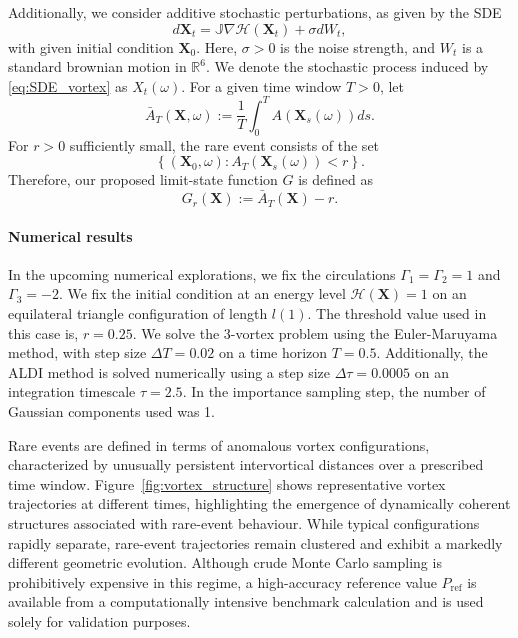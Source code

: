 \documentclass[a4paper]{article}
\numberwithin{equation}{section}
\begin{document}
Additionally, we consider additive stochastic perturbations, as given by the SDE
\begin{equation}
    \label{eq:SDE_vortex}
d\bm{X}_t = \mathbb{J} \nabla\mathcal{H}(\bm{X}_t) + \sigma dW_t,
\end{equation}
with given initial condition $\bm{X}_0$. 
Here, $\sigma>0$ is the noise strength, and $W_t$ is a standard brownian motion in $\mathbb{R}^6$. We denote the stochastic process induced by \eqref{eq:SDE_vortex} as $X_t(\omega)$. For a given time window $T>0$, let
\begin{equation}
    \label{eq:averaged_observable}
\bar{A}_T(\bm{X},\omega):= \frac{1}{T}\int_0^TA\left( \bm{X}_s(\omega) \right)ds.
\end{equation}
For $r>0$ sufficiently small, the rare event consists of the set
\[
    \left\{ (\bm{X}_0,\omega) : A_T(\bm{X}_s(\omega))<r \right\}.
\]
Therefore, our proposed limit-state function $G$ is defined as
\begin{equation}
    \label{eq:limit-state function_vortex}
G_r(\bm{X}):= \bar{A}_T(\bm{X})-r.
\end{equation}


\paragraph{Numerical results}

In the upcoming numerical explorations, we fix the circulations $\Gamma_1=\Gamma_2=1$ and $\Gamma_3=-2$. We fix the initial condition at an energy level $\mathcal{H}(\mathbf{X})=1$ on an equilateral triangle configuration of length $l(1)$. The threshold value used in this case is, $r=0.25$. We solve the $3$-vortex problem using the Euler-Maruyama method, with step size $\Delta T=0.02$ on a time horizon $T=0.5$. Additionally, the ALDI method is solved numerically using a step size $\Delta \tau=0.0005$ on an integration timescale $\tau=2.5$. In the importance sampling step, the number of Gaussian components used was 1.

Rare events are defined in terms of anomalous vortex configurations,
characterized by unusually persistent intervortical distances over a prescribed
time window. Figure~\ref{fig:vortex_structure} shows representative vortex
trajectories at different times, highlighting the emergence of dynamically
coherent structures associated with rare-event behaviour. While typical
configurations rapidly separate, rare-event trajectories remain clustered and
exhibit a markedly different geometric evolution. Although crude Monte Carlo sampling is prohibitively expensive in this regime,
a high-accuracy reference value $P_{\mathrm{ref}}$ is available from a
computationally intensive benchmark calculation and is used solely for
validation purposes.
\end{document}
